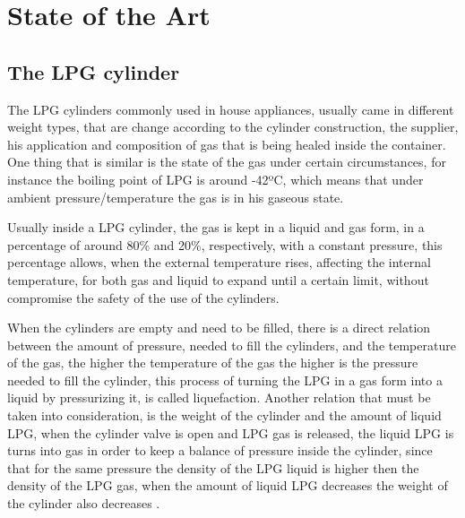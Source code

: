 \cleardoublepage
\chapter{State of the Art}%

\section{The LPG cylinder}
The LPG cylinders commonly used in house appliances, usually came in different weight types, that are change according to the cylinder construction, the supplier, his application and composition of gas that is being healed inside the container. One thing that is similar is the state of the gas under certain circumstances, for instance the boiling point of LPG is around -42ºC, which means that under ambient pressure/temperature the gas is in his gaseous state. 

Usually inside a LPG cylinder, the gas is kept in a liquid and gas form, in a percentage of around 80\% and 20\%, respectively, with a constant pressure, this percentage allows, when the external temperature rises, affecting the internal temperature, for both gas and liquid to expand until a certain limit, without compromise the safety of the use of the cylinders.

When the cylinders are empty and need to be filled, there is a direct relation between the amount of pressure, needed to fill the cylinders, and the temperature of the gas, the higher the temperature of the gas the higher is the pressure needed to fill the cylinder, this process of turning the LPG in a gas form into a liquid by pressurizing it, is called liquefaction. Another relation that must be taken into consideration, is the weight of the cylinder and the amount of liquid LPG, when the cylinder valve is open and LPG gas is released, the liquid LPG is turns into gas in order to keep a balance of pressure inside the cylinder, since that for the same pressure the density of the LPG liquid is higher then the density of the LPG gas, when the amount of liquid LPG decreases the weight of the cylinder also decreases \cite{WhatAreProperties} \cite{PropaneDensitySpecific}.

